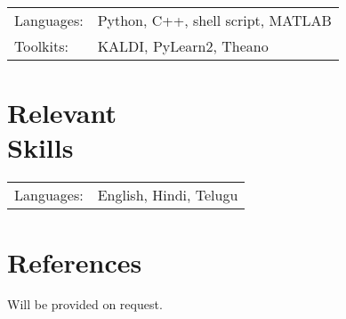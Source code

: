 \documentclass[margin,line,pifont,palatino,courier]{res}
\begin{document}
\begin{resume}
\begin{tabular}{@{}p{0.8in}p{6in}}

Languages:& Python, C++, shell script, MATLAB\\
Toolkits: & KALDI, PyLearn2, Theano \\

\end{tabular}

\section{\sc Relevant \\ Skills}

\begin{tabular}{@{}p{0.8in}p{6in}}

Languages:& English, Hindi, Telugu\\

\end{tabular}




\section{\sc References}

Will be provided on request.

\end{resume}
\end{document}
